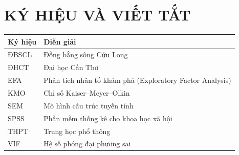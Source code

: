 \chapter*{KÝ HIỆU VÀ VIẾT TẮT}
\begin{longtable}{p{3cm}p{10cm}}
\toprule Ký hiệu & Diễn giải\\\midrule
ĐBSCL & Đồng bằng sông Cửu Long\\
ĐHCT & Đại học Cần Thơ\\
EFA & Phân tích nhân tố khám phá (Exploratory Factor Analysis)\\
KMO & Chỉ số Kaiser--Meyer--Olkin\\
SEM & Mô hình cấu trúc tuyến tính\\
SPSS & Phần mềm thống kê cho khoa học xã hội\\
THPT & Trung học phổ thông\\
VIF & Hệ số phóng đại phương sai\\
\bottomrule
\end{longtable}
